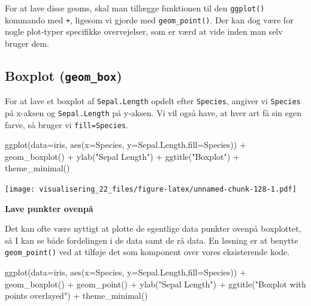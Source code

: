 \documentclass[
]{book}
\newenvironment{Shaded}{\begin{snugshade}}{\end{snugshade}}
\newcommand{\AttributeTok}[1]{\textcolor[rgb]{0.77,0.63,0.00}{#1}}
\newcommand{\FunctionTok}[1]{\textcolor[rgb]{0.00,0.00,0.00}{#1}}
\newcommand{\NormalTok}[1]{#1}
\newcommand{\SpecialCharTok}[1]{\textcolor[rgb]{0.00,0.00,0.00}{#1}}
\newcommand{\StringTok}[1]{\textcolor[rgb]{0.31,0.60,0.02}{#1}}
\begin{document}
For at lave disse geoms, skal man tillægge funktionen til den \texttt{ggplot()} kommando med \texttt{+}, ligesom vi gjorde med \texttt{geom\_point()}. Der kan dog være for nogle plot-typer specifikke overvejelser, som er værd at vide inden man selv bruger dem.

\hypertarget{boxplot-geom_box}{%
\subsection{\texorpdfstring{Boxplot (\texttt{geom\_box})}{Boxplot (geom\_box)}}\label{boxplot-geom_box}}

For at lave et boxplot af \texttt{Sepal.Length} opdelt efter \texttt{Species}, angiver vi \texttt{Species} på x-aksen og \texttt{Sepal.Length} på y-aksen. Vi vil også have, at hver art få sin egen farve, så bruger vi \texttt{fill=Species}.

\begin{Shaded}
\begin{Highlighting}[]
\FunctionTok{ggplot}\NormalTok{(}\AttributeTok{data=}\NormalTok{iris, }\FunctionTok{aes}\NormalTok{(}\AttributeTok{x=}\NormalTok{Species, }\AttributeTok{y=}\NormalTok{Sepal.Length,}\AttributeTok{fill=}\NormalTok{Species)) }\SpecialCharTok{+} 
  \FunctionTok{geom\_boxplot}\NormalTok{() }\SpecialCharTok{+} 
  \FunctionTok{ylab}\NormalTok{(}\StringTok{"Sepal Length"}\NormalTok{) }\SpecialCharTok{+} 
  \FunctionTok{ggtitle}\NormalTok{(}\StringTok{"Boxplot"}\NormalTok{) }\SpecialCharTok{+}
  \FunctionTok{theme\_minimal}\NormalTok{()}
\end{Highlighting}
\end{Shaded}

\texttt{[image: visualisering\_22\_files/figure-latex/unnamed-chunk-128-1.pdf]}

\textbf{Lave punkter ovenpå}

Det kan ofte være nyttigt at plotte de egentlige data punkter ovenpå boxplottet, så I kan se både fordelingen i de data samt de rå data. En løsning er at benytte \texttt{geom\_point()} ved at tilføje det som komponent over vores eksisterende kode.

\begin{Shaded}
\begin{Highlighting}[]
\FunctionTok{ggplot}\NormalTok{(}\AttributeTok{data=}\NormalTok{iris, }\FunctionTok{aes}\NormalTok{(}\AttributeTok{x=}\NormalTok{Species, }\AttributeTok{y=}\NormalTok{Sepal.Length,}\AttributeTok{fill=}\NormalTok{Species)) }\SpecialCharTok{+} 
  \FunctionTok{geom\_boxplot}\NormalTok{() }\SpecialCharTok{+} 
  \FunctionTok{geom\_point}\NormalTok{() }\SpecialCharTok{+} 
  \FunctionTok{ylab}\NormalTok{(}\StringTok{"Sepal Length"}\NormalTok{) }\SpecialCharTok{+} 
  \FunctionTok{ggtitle}\NormalTok{(}\StringTok{"Boxplot with points overlayed"}\NormalTok{) }\SpecialCharTok{+} 
  \FunctionTok{theme\_minimal}\NormalTok{()}
\end{Highlighting}
\end{Shaded}
\end{document}
